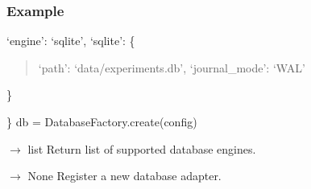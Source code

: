 \documentclass[letterpaper,10pt,english]{sphinxmanual}
\begin{document}
\begin{fulllineitems}
\begin{fulllineitems}
\begin{quote}
\begin{description}
\end{description}\end{quote}
\subsubsection*{Example}
\begin{description}
\sphinxAtStartPar
‘engine’: ‘sqlite’,
‘sqlite’: \{
\begin{quote}

\sphinxAtStartPar
‘path’: ‘data/experiments.db’,
‘journal\_mode’: ‘WAL’
\end{quote}

\sphinxAtStartPar
\}

\end{description}

\sphinxAtStartPar
\}
db = DatabaseFactory.create(config)

\end{fulllineitems}


\begin{fulllineitems}
\label{\detokenize{core.database.factory:core.database.factory.DatabaseFactory.list_supported_engines}}
\pysigstartsignatures
\pysiglinewithargsret
{}
{}
{{ $\rightarrow$ list}}
\pysigstopsignatures
\sphinxAtStartPar
Return list of supported database engines.

\end{fulllineitems}


\begin{fulllineitems}
\label{\detokenize{core.database.factory:core.database.factory.DatabaseFactory.register_adapter}}
\pysigstartsignatures
\pysiglinewithargsret
{}
{\sphinxparamcomma {}}
{{ $\rightarrow$ None}}
\pysigstopsignatures
\sphinxAtStartPar
Register a new database adapter.


\end{fulllineitems}
\end{fulllineitems}
\end{document}
